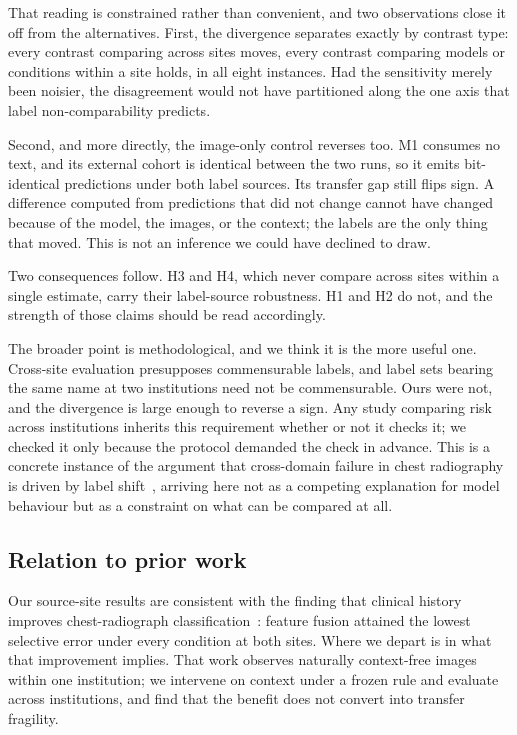That reading is constrained rather than convenient, and two observations close
it off from the alternatives. First, the divergence separates exactly by contrast
type: every contrast comparing across sites moves, every contrast comparing
models or conditions within a site holds, in all eight instances. Had the
sensitivity merely been noisier, the disagreement would not have partitioned
along the one axis that label non-comparability predicts.

Second, and more directly, the image-only control reverses too. M1 consumes no
text, and its external cohort is identical between the two runs, so it emits
bit-identical predictions under both label sources. Its transfer gap still flips
sign. A difference computed from predictions that did not change cannot have
changed because of the model, the images, or the context; the labels are the only
thing that moved. This is not an inference we could have declined to draw.

Two consequences follow. H3 and H4, which never compare across sites within a
single estimate, carry their label-source robustness. H1 and H2 do not, and the
strength of those claims should be read accordingly.

The broader point is methodological, and we think it is the more useful one.
Cross-site evaluation presupposes commensurable labels, and label sets bearing
the same name at two institutions need not be commensurable. Ours were not, and
the divergence is large enough to reverse a sign. Any study comparing risk
across institutions inherits this requirement whether or not it checks it; we
checked it only because the protocol demanded the check in advance. This is a
concrete instance of the argument that cross-domain failure in chest radiography
is driven by label shift~\cite{cohen2020limits}, arriving here not as a
competing explanation for model behaviour but as a constraint on what can be
compared at all.

\subsection{Relation to prior work}

Our source-site results are consistent with the finding that clinical history
improves chest-radiograph classification~\cite{yang2025mcxnet}: feature fusion
attained the lowest selective error under every condition at both sites. Where
we depart is in what that improvement implies. That work observes naturally
context-free images within one institution; we intervene on context under a
frozen rule and evaluate across institutions, and find that the benefit does not
convert into transfer fragility.

